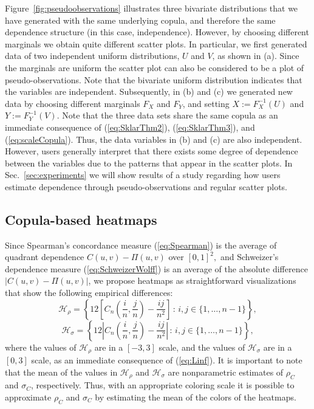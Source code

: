 \documentclass[journal]{vgtc}                %
\begin{document}
Figure~\ref{fig:pseudoobservations} illustrates three bivariate distributions that we have generated with the same underlying copula, and therefore the same dependence structure (in this case, independence). However, by choosing different marginals we obtain quite different scatter plots. In particular, we first generated data of two independent uniform distributions, $U$ and $V$, as shown in (a). Since the marginals are uniform the scatter plot can also be considered to be a plot of pseudo-observations. Note that the bivariate uniform distribution indicates that the variables are independent. Subsequently, in (b) and (c) we generated new data by choosing different marginals $F_{X}$ and $F_{Y}$, and setting $X := F_{X}^{-1}(U)$ and $Y := F_{Y}^{-1}(V)$. Note that the three data sets share the same copula as an immediate consequence of (\ref{eq:SklarThm2}), (\ref{eq:SklarThm3}), and (\ref{eq:scaleCopula}). Thus, the data variables in (b) and (c) are also independent. However, users generally interpret that there exists some degree of dependence between the variables due to the patterns that appear in the scatter plots. In Sec.~\ref{sec:experiments} we will show results of a study regarding how users estimate dependence through pseudo-observations and regular scatter plots.


\subsection{Copula-based heatmaps}

Since Spearman's concordance measure (\ref{eq:Spearman}) is the average of quadrant dependence $C(u,v)-\Pi(u,v)$ over $[0,1]^2,$ and Schweizer's dependence measure (\ref{eq:SchweizerWolff}) is an average of the absolute difference $|C(u,v)-\Pi(u,v)|$, we propose heatmaps as straightforward visualizations that show the following empirical differences:
\begin{equation}\label{eq:heatmaprho}
    \mathcal{H}_{\rho} = \left\{12\left[C_n(\frac{i}{n},\frac{j}{n})-\frac{ij}{n^2}\right]\,:\,i,j\in\{1,\ldots,n-1\}\right\},
\end{equation}
\begin{equation}\label{eq:heatmapsigma}
    \mathcal{H}_{\sigma} = \left\{12\left|C_n(\frac{i}{n},\frac{j}{n})-\frac{ij}{n^2}\right|\,:\,i,j\in\{1,\ldots,n-1\}\right\},
\end{equation}
where the values of $\mathcal{H}_{\rho}$ are in a $[-3,3]$ scale, and the values of $\mathcal{H}_{\sigma}$ are in a $[0,3]$ scale, as an immediate consequence of (\ref{eq:Linf}). It is important to note that the mean of the values in $\mathcal{H}_{\rho}$ and $\mathcal{H}_{\sigma}$ are nonparametric estimates of $\rho_{C}$ and $\sigma_{C}$, respectively. Thus, with an appropriate coloring scale it is possible to approximate $\rho_{C}$ and $\sigma_{C}$ by estimating the mean of the colors of the heatmaps.
\end{document}
